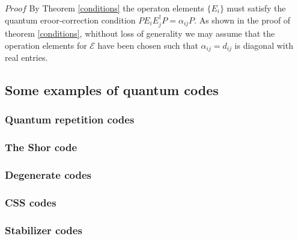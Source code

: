 \documentclass{article}
\begin{document}
$Proof$
By Theorem \ref{conditions} the operaton elements $\{E_i\}$ must
satisfy the quantum eroor-correction condition $PE_iE_j^\dag P = \alpha_{ij}P$.
As shown in the proof of theorem \ref{conditions}, whithout loss
of generality we may assume that the operation elements for $\mathcal{E}$ have been
chosen such that $\alpha_{ij} = d_{ij}$ is diagonal with real entries.

\subsection{Some examples of quantum codes}

\subsubsection{Quantum repetition codes}

\subsubsection{The Shor code}

\subsubsection{Degenerate codes}

\subsubsection{CSS codes}

\subsubsection{Stabilizer codes}
\end{document}
